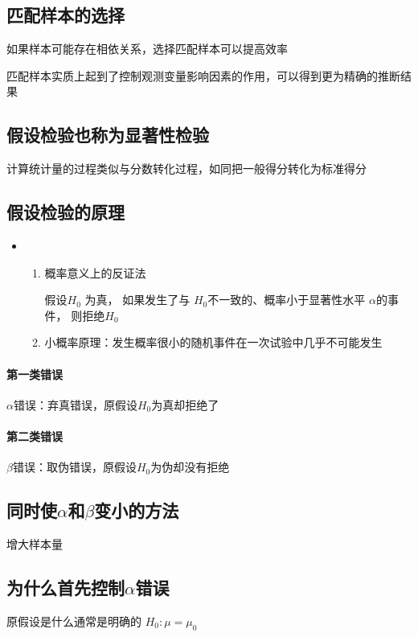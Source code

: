 \documentclass[UTF8,10pt]{book}
\begin{document}
{        \subsection{匹配样本的选择}	
        如果样本可能存在相依关系，选择匹配样本可以提高效率 
        
        匹配样本实质上起到了控制观测变量影响因素的作用，可以得到更为精确的推断结果
        \subsection{假设检验也称为显著性检验}	

        计算统计量的过程类似与分数转化过程，如同把一般得分转化为标准得分	

        \subsection{假设检验的原理}	
        {\kaishu
		\begin{itemize}
			\item [] {
				\begin{enumerate}
					\item 概率意义上的反证法 
					
					假设$ H_0 $ 为真，
					如果发生了与 $ H_0 $不一致的、概率小于显著性水平 $ \alpha $的事件，
					则拒绝$ H_0 $ 
					\item 小概率原理：发生概率很小的随机事件在一次试验中几乎不可能发生
				\end{enumerate}
			}
		\end{itemize}
		}
	
        \paragraph{第一类错误}
        $ \alpha $错误：弃真错误，原假设$H_0$为真却拒绝了

        \paragraph{第二类错误}	
        $ \beta $错误：取伪错误，原假设$H_0$为伪却没有拒绝

        \subsection{同时使$\alpha$和$\beta$变小的方法}	
        增大样本量

        \subsection{为什么首先控制$\alpha$错误}	
        原假设是什么通常是明确的 $H_0: \mu = \mu_0$ 
        
}
\end{document}
